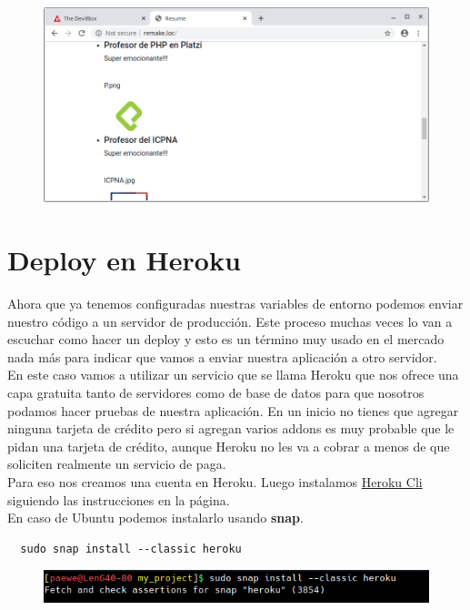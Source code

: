 \documentclass{article}
\begin{document}
\begin{figure}[h!]
  \centering
  \includegraphics[scale=0.5]{./Pictures/223_conexion_bd_ok.png}
\end{figure}


\newpage

\section{Deploy en Heroku}%
Ahora que ya tenemos configuradas nuestras variables de entorno podemos enviar
nuestro código a un servidor de producción. Este proceso muchas veces lo van a
escuchar como hacer un deploy y esto es un término muy usado en el mercado nada
más para indicar que vamos a enviar nuestra aplicación a otro servidor.\\

En este caso vamos a utilizar un servicio que se llama Heroku que nos ofrece
una capa gratuita tanto de servidores como de base de datos para que nosotros
podamos hacer pruebas de nuestra aplicación. En un inicio no tienes que agregar
ninguna tarjeta de crédito pero si agregan varios addons es muy probable que le
pidan una tarjeta de crédito, aunque Heroku no les va a cobrar a menos de que
soliciten realmente un servicio de paga.\\

Para eso nos creamos una cuenta en Heroku. Luego instalamos
\href{https://devcenter.heroku.com/articles/heroku-cli}{Heroku Cli} siguiendo
las instrucciones en la página.\\

En caso de Ubuntu podemos instalarlo usando \textbf{snap}.

\begin{verbatim}
  sudo snap install --classic heroku
\end{verbatim}

\begin{figure}[h!]
  \centering
  \includegraphics[scale=0.5]{./Pictures/246_instalar_herokucli.png}
\end{figure}
\end{document}
